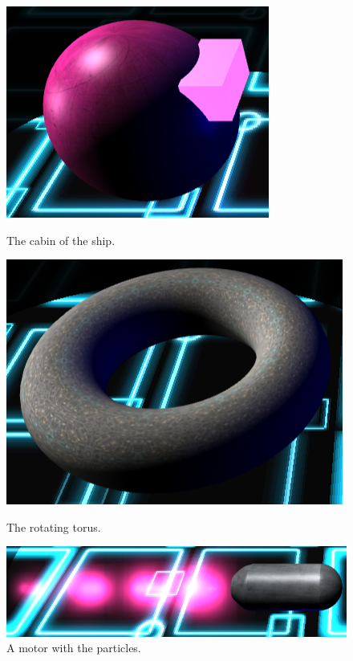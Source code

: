 \documentclass[11pt]{article}
\begin{document}
	\begin{figure}
		\centering
		\begin{minipage}[b]{0.25\linewidth}
			\includegraphics[width=\linewidth]{cabin}
			\caption{The cabin of the ship.}
			\label{fig:cabin}
		\end{minipage}
		\begin{minipage}[b]{0.276\linewidth}
			\includegraphics[width=\linewidth]{toro}
			\caption{The rotating torus.}
			\label{fig:toro}
		\end{minipage}
		\begin{minipage}[b]{0.6\linewidth}
			\includegraphics[width=\linewidth]{motor}
			\caption{A motor with the particles.}
			\label{fig:motor}
		\end{minipage}
	\end{figure}
\end{document}
